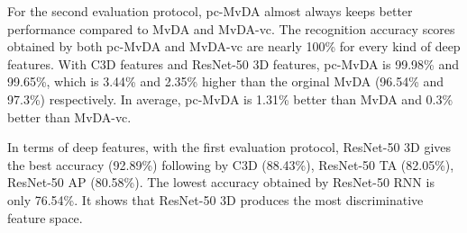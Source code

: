     For the second evaluation protocol, pc-MvDA almost always keeps better performance compared to MvDA and MvDA-vc. The recognition accuracy scores obtained by both pc-MvDA and MvDA-vc are nearly 100\% for every kind of deep features. With C3D features and ResNet-50 3D features, pc-MvDA is 99.98\% and 99.65\%, which is 3.44\% and 2.35\% higher than the orginal MvDA (96.54\% and 97.3\%) respectively. In average, pc-MvDA is 1.31\% better than MvDA and 0.3\% better than MvDA-vc. 

    In terms of deep features, with the first evaluation protocol, ResNet-50 3D gives the best accuracy (92.89\%) following by C3D (88.43\%), ResNet-50 TA (82.05\%), ResNet-50 AP (80.58\%). The lowest accuracy obtained by ResNet-50 RNN is only 76.54\%. It shows that ResNet-50 3D produces the most discriminative feature space. %

    \begin{table}[htbp]
    \centering
    \caption{Cross-view recognition results of different features on IXMAS dataset with pc-MvDA method. The result in the bracket are accuracies of using features C3D, ResNet-50 3D, ResNet-50 RNN, ResNet-50 TA, Restnet-50 AP respectively. Each row corresponds to training view (from view C0 to view C3). Each column corresponds to testing view (from view C0 to view C3)}
    \label{tab:cross_feature_ixmas}
    \end{table}

